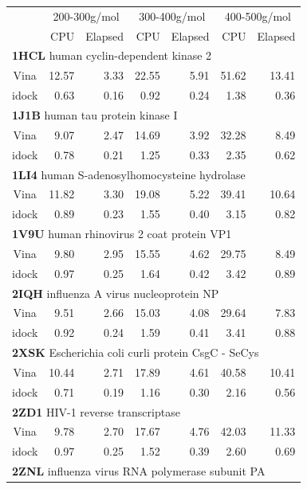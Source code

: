 \documentclass[12pt]{article}
\begin{document}
\begin{table}
\centering
\begin{tabular}{crrrrrr}
\hline
& \multicolumn{2}{c}{200-300g/mol} & \multicolumn{2}{c}{300-400g/mol} & \multicolumn{2}{c}{400-500g/mol}\\
& CPU & Elapsed & CPU & Elapsed & CPU & Elapsed\\
\hline
\multicolumn{7}{l}{\textbf{1HCL} human cyclin-dependent kinase 2}\\
Vina  & 12.57 &  3.33 & 22.55 &  5.91 & 51.62 & 13.41\\
idock &  0.63 &  0.16 &  0.92 &  0.24 &  1.38 &  0.36\\
\multicolumn{7}{l}{\textbf{1J1B} human tau protein kinase I}\\
Vina  &  9.07 &  2.47 & 14.69 &  3.92 & 32.28 &  8.49\\
idock &  0.78 &  0.21 &  1.25 &  0.33 &  2.35 &  0.62\\
\multicolumn{7}{l}{\textbf{1LI4} human S-adenosylhomocysteine hydrolase}\\
Vina  & 11.82 &  3.30 & 19.08 &  5.22 & 39.41 & 10.64\\
idock &  0.89 &  0.23 &  1.55 &  0.40 &  3.15 &  0.82\\
\multicolumn{7}{l}{\textbf{1V9U} human rhinovirus 2 coat protein VP1}\\
Vina  &  9.80 &  2.95 & 15.55 &  4.62 & 29.75 &  8.49\\
idock &  0.97 &  0.25 &  1.64 &  0.42 &  3.42 &  0.89\\
\multicolumn{7}{l}{\textbf{2IQH} influenza A virus nucleoprotein NP}\\
Vina  &  9.51 &  2.66 & 15.03 &  4.08 & 29.64 &  7.83\\
idock &  0.92 &  0.24 &  1.59 &  0.41 &  3.41 &  0.88\\
\multicolumn{7}{l}{\textbf{2XSK} Escherichia coli curli protein CsgC - SeCys}\\
Vina  & 10.44 &  2.71 & 17.89 &  4.61 & 40.58 & 10.41\\
idock &  0.71 &  0.19 &  1.16 &  0.30 &  2.16 &  0.56\\
\multicolumn{7}{l}{\textbf{2ZD1} HIV-1 reverse transcriptase}\\
Vina  &  9.78 &  2.70 & 17.67 &  4.76 & 42.03 & 11.33\\
idock &  0.97 &  0.25 &  1.52 &  0.39 &  2.60 &  0.69\\
\multicolumn{7}{l}{\textbf{2ZNL} influenza virus RNA polymerase subunit PA}\\

\end{tabular}
\end{table}
\end{document}
